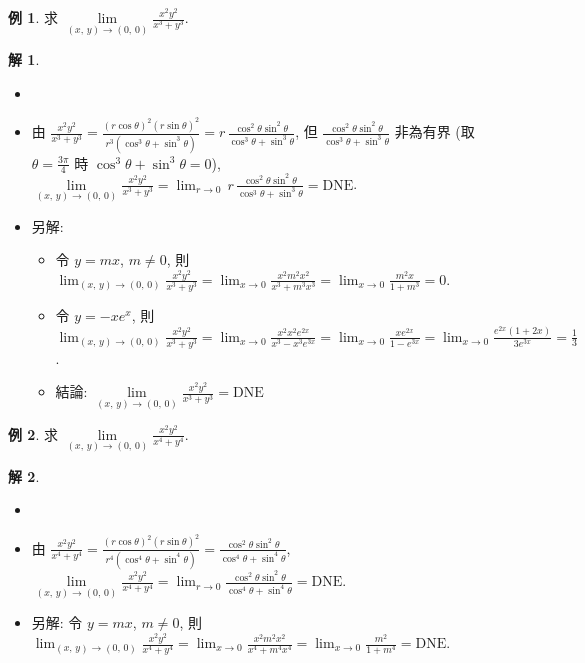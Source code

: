 \documentclass[12pt]{extarticle}
\newcommand{\ds}{\displaystyle}
\theoremstyle{definition}
\newtheorem*{ex}{例}
\newtheorem*{sol}{解}
\begin{document}
\begin{ex}
  求 $\ds\lim\limits_{(x,\,y)\to (0,\,0)}\frac{x^2y^2}{x^3 + y^3}$. 
\end{ex}
\begin{sol}
  \begin{itemize}\setlength{\itemsep}{0pt}
    \item[]
    \item 由 $\ds\frac{x^2y^2}{x^3 + y^3} = \frac{(r\cos\theta)^2(r\sin\theta)^2}{r^3(\cos^3\theta + \sin^3\theta)} = r\,\frac{\cos^2\theta\sin^2\theta}{\cos^3\theta + \sin^3\theta}$, 但 $\ds\frac{\cos^2\theta\sin^2\theta}{\cos^3\theta + \sin^3\theta}$ 非為有界 (取 $\ds\theta = \frac{3\pi}{4}$ 時 $\cos^3\theta + \sin^3\theta = 0$), $\ds\lim\limits_{(x,\,y)\to (0,\,0)}\frac{x^2y^2}{x^3 + y^3} = \lim_{r\to 0}\,r\,\frac{\cos^2\theta\sin^2\theta}{\cos^3\theta + \sin^3\theta} = \text{DNE}$. 
    \item 另解: 
      \begin{itemize}\setlength{\itemsep}{0pt}
        \item 令 $y = mx$, $m\ne 0$, 則 $\ds\lim_{(x,\,y)\to (0,\,0)}\frac{x^2y^2}{x^3 + y^3} = \lim_{x\to 0}\frac{x^2m^2x^2}{x^3 + m^3 x^3} = \lim_{x\to 0}\frac{m^2x}{1 + m^3} = 0$. 
        \item 令 $\ds y = -xe^x$, 則 $\ds\lim_{(x,\,y)\to (0,\,0)}\frac{x^2y^2}{x^3 + y^3} = \lim_{x\to 0}\frac{x^2x^2e^{2x}}{x^3 - x^3e^{3x}} = \lim_{x\to 0}\frac{xe^{2x}}{1 - e^{3x}} = \lim_{x\to 0}\frac{e^{2x}(1 + 2x)}{3e^{3x}} = \frac{1}{3}$. 
        \item 結論: $\ds\lim\limits_{(x,\,y)\to(0,\,0)}\frac{x^2y^2}{x^3 + y^3} = \text{DNE}$
      \end{itemize}
  \end{itemize}
\end{sol}

\begin{ex}
  求 $\ds\lim\limits_{(x,\,y)\to (0,\,0)}\frac{x^2y^2}{x^4 + y^4}$. 
\end{ex}
\begin{sol}
  \begin{itemize}\setlength{\itemsep}{0pt}
    \item[]
    \item 由 $\ds\frac{x^2y^2}{x^4 + y^4} = \frac{(r\cos\theta)^2(r\sin\theta)^2}{r^4(\cos^4\theta + \sin^4\theta)} = \frac{\cos^2\theta\sin^2\theta}{\cos^4\theta + \sin^4\theta}$, $\ds\lim\limits_{(x,\,y)\to (0,\,0)}\frac{x^2y^2}{x^4 + y^4} = \lim_{r\to 0}\frac{\cos^2\theta\sin^2\theta}{\cos^4\theta + \sin^4\theta} = \text{DNE}$. 
    \item 另解: 令 $y = mx$, $m\ne 0$, 則 $\ds\lim_{(x,\,y)\to (0,\,0)}\frac{x^2y^2}{x^4 + y^4} = \lim_{x\to 0}\frac{x^2m^2x^2}{x^4 + m^4 x^4} = \lim_{x\to 0}\frac{m^2}{1 + m^4} = \text{DNE}$. 
  \end{itemize}
\end{sol}
\end{document}
